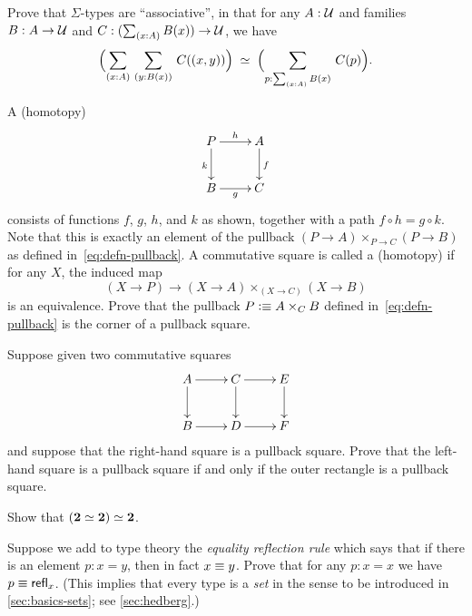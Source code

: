 \begin{ex}\label{ex:sigma-assoc}
  Prove that $\Sigma$-types are ``associative'',
  in that for any $A:\mathcal{U}$ and families $B:A\to\mathcal{U}$ and $C:(\sm{x:A} B(x))\to\UU$, we have
  \[\eqvspaced{\Parens{\sm{x:A}{y:B(x)} C(\pairr{x,y})}}{\Parens{\sm{p:\sm{x:A}B(x)} C(p)}}. \]
\end{ex}

\begin{ex}\label{ex:pullback}
  A (homotopy) 
  \begin{equation*}
  \vcenter{\xymatrix{
      P\ar[r]^h\ar[d]_k &
      A\ar[d]^f\\
      B\ar[r]_g &
      C
      }}
  \end{equation*}
  consists of functions $f$, $g$, $h$, and $k$ as shown, together with a path $f \circ h= g \circ k$.
  Note that this is exactly an element of the pullback $(P\to A) \times_{P\to C} (P\to B)$ as defined in~\eqref{eq:defn-pullback}.
  A commutative square is called a (homotopy) 
  if for any $X$, the induced map
  \[ (X\to P) \to (X\to A) \times_{(X\to C)} (X\to B) \]
  is an equivalence.
  Prove that the pullback $P \vcentcolon\equiv A\times_C B$ defined in~\eqref{eq:defn-pullback} is the corner of a pullback square.
\end{ex}

\begin{ex}\label{ex:pullback-pasting}
  Suppose given two commutative squares
  \begin{equation*}
    \vcenter{\xymatrix{
        A\ar[r]\ar[d] &
        C\ar[r]\ar[d] &
        E\ar[d]\\
        B\ar[r] &
        D\ar[r] &
        F
      }}
  \end{equation*}
  and suppose that the right-hand square is a pullback square.
  Prove that the left-hand square is a pullback square if and only if the outer rectangle is a pullback square.
\end{ex}

\begin{ex}\label{ex:eqvboolbool}
  Show that $(\mathbf{2} \simeq \mathbf{2}) \simeq \mathbf{2}$.
\end{ex}

\begin{ex}\label{ex:equality-reflection}
  Suppose we add to type theory the \emph{equality reflection rule} which says that if there is an element $p:x=y$, then in fact $x\equiv y$.
  Prove that for any $p:x=x$ we have $p\equiv \mathsf{refl}_{x}$.
  (This implies that every type is a \emph{set} in the sense to be introduced in \autoref{sec:basics-sets}; see \autoref{sec:hedberg}.)
\end{ex}


